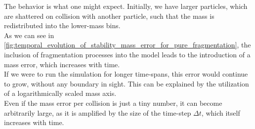         The behavior is what one might expect. Initially, we have larger particles, which 
        are shattered on collision with another particle, such that the mass is 
        redistributed into the lower-mass bins. \\

        As we can see in
        \cref{fig:temporal_evolution_of_stability_mass_error_for_pure_fragmentation},
        the inclusion of fragmentation processes into the model leads to the 
        introduction of a mass error, which increases with time. \\

        If we were to run the simulation for longer time-spans, this error would 
        continue to grow, without any boundary in sight. This can be explained by 
        the utilization of a logarithmically scaled mass axis. \\

        Even if the mass error per collision is just a tiny number, it can become 
        arbitrarily large, as it is amplified by the size of the time-step $\Delta t$,
        which itself increases with time.

